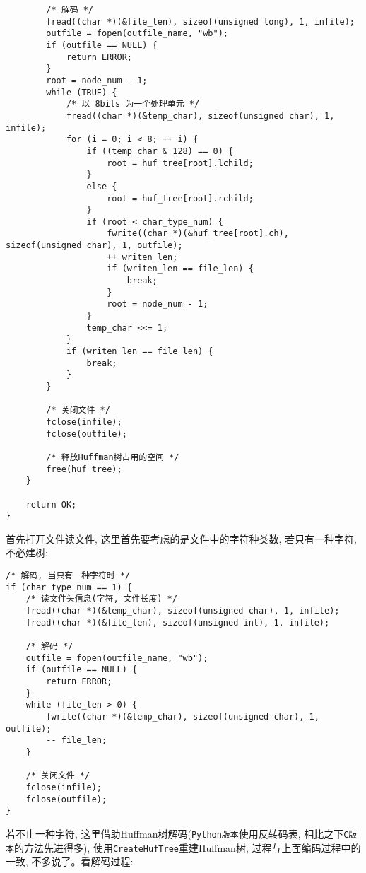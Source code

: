 \documentclass[a4paper]{ctexart}
\begin{document}
{\begin{lstlisting}
        /* 解码 */
        fread((char *)(&file_len), sizeof(unsigned long), 1, infile);
        outfile = fopen(outfile_name, "wb");
        if (outfile == NULL) {
            return ERROR;
        }
        root = node_num - 1;
        while (TRUE) {
            /* 以 8bits 为一个处理单元 */
            fread((char *)(&temp_char), sizeof(unsigned char), 1, infile);
            for (i = 0; i < 8; ++ i) {
                if ((temp_char & 128) == 0) {
                    root = huf_tree[root].lchild;
                }
                else {
                    root = huf_tree[root].rchild;
                }
                if (root < char_type_num) {
                    fwrite((char *)(&huf_tree[root].ch), sizeof(unsigned char), 1, outfile);
                    ++ writen_len;
                    if (writen_len == file_len) {
                        break;
                    }
                    root = node_num - 1;
                }
                temp_char <<= 1;
            }
            if (writen_len == file_len) {
                break;
            }
        }

        /* 关闭文件 */
        fclose(infile);
        fclose(outfile);

        /* 释放Huffman树占用的空间 */
        free(huf_tree);
    }

    return OK;
}
\end{lstlisting}}

首先打开文件读文件, 这里首先要考虑的是文件中的字符种类数, 若只有一种字符, 不必建树:

{\setmainfont{Courier New Bold}              
\begin{lstlisting}
/* 解码, 当只有一种字符时 */
if (char_type_num == 1) {
    /* 读文件头信息(字符, 文件长度) */
    fread((char *)(&temp_char), sizeof(unsigned char), 1, infile);
    fread((char *)(&file_len), sizeof(unsigned int), 1, infile);

    /* 解码 */
    outfile = fopen(outfile_name, "wb");
    if (outfile == NULL) {
        return ERROR;
    }
    while (file_len > 0) {
    	fwrite((char *)(&temp_char), sizeof(unsigned char), 1, outfile);
        -- file_len;
    }

    /* 关闭文件 */
    fclose(infile);
    fclose(outfile);
}
\end{lstlisting}}

若不止一种字符, 这里借助Huffman树解码(\texttt{Python版本}使用反转码表, 相比之下\texttt{C版本}的方法先进得多), 使用\texttt{CreateHufTree}重建Huffman树, 过程与上面编码过程中的一致, 不多说了。看解码过程:
\end{document}
